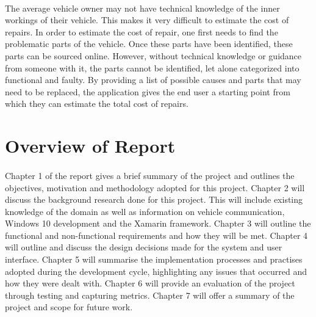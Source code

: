 	\paragraph{}{
	The average vehicle owner may not have technical knowledge of the inner workings of their vehicle. This makes it very difficult to estimate the cost of repairs. In order to estimate the cost of repair, one first needs to find the problematic parts of the vehicle. Once these parts have been identified, these parts can be sourced online. However, without technical knowledge or guidance from someone with it, the parts cannot be identified, let alone categorized into functional and faulty. By providing a list of possible causes and parts that may need to be replaced, the application gives the end user a starting point from which they can estimate the total cost of repairs. 
	}

\section{Overview of Report}
	\paragraph{}{
	Chapter 1 of the report gives a brief summary of the project and outlines the objectives, motivation and methodology adopted for this project. Chapter 2 will discuss the background research done for this project. This will include existing knowledge of the domain as well as information on vehicle communication, Windows 10 development and the Xamarin framework. Chapter 3 will outline the functional and non-functional requirements and how they will be met. Chapter 4 will outline and discuss the design decisions made for the system and user interface. Chapter 5 will summarise the implementation processes and practises adopted during the development cycle, highlighting any issues that occurred and how they were dealt with. Chapter 6 will provide an evaluation of the project through testing and capturing metrics. Chapter 7 will offer a summary of the project and scope for future work. 
	}	
